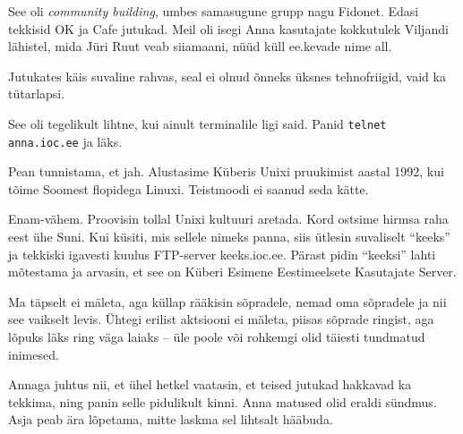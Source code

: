 
See oli \emph{community building}, umbes samasugune grupp nagu Fidonet. Edasi 
tekkisid OK  ja 
Cafe jutukad. Meil oli 
isegi Anna kasutajate kokkutulek Viljandi lähistel, mida 
Jüri Ruut veab siiamaani, nüüd küll ee.kevade nime all.

Jutukates käis suvaline rahvas, seal ei olnud õnneks üksnes tehnofriigid, vaid ka tütarlapsi. 


See oli tegelikult lihtne, kui ainult terminalile ligi said. Panid 
\verb|telnet anna.ioc.ee| ja läks. 


Pean tunnistama, et jah. Alustasime Küberis Unixi pruukimist aastal 
1992, kui tõime Soomest flopidega Linuxi. Teistmoodi ei 
saanud seda kätte. 


Enam-vähem. Proovisin tollal Unixi kultuuri aretada. Kord ostsime hirmsa
raha eest ühe Suni. Kui küsiti, mis sellele nimeks panna, siis ütlesin suvaliselt 
\enquote{keeks} ja tekkiski igavesti kuulus FTP-server keeks.ioc.ee. Pärast pidin \enquote{keeksi} lahti mõtestama ja 
arvasin, et see on Küberi Esimene Eestimeelsete Kasutajate Server.


Ma täpselt ei mäleta, aga küllap rääkisin sõpradele, nemad oma 
sõpradele ja nii see vaikselt levis. Ühtegi erilist 
aktsiooni ei mäleta, piisas sõprade ringist, aga lõpuks läks 
ring väga laiaks -- üle poole või rohkemgi olid 
täiesti tundmatud inimesed. 

Annaga juhtus nii, et ühel hetkel vaatasin, et 
teised jutukad hakkavad ka tekkima, ning panin selle pidulikult kinni. 
Anna matused olid eraldi sündmus. Asja peab ära lõpetama, mitte laskma 
sel lihtsalt hääbuda. 

